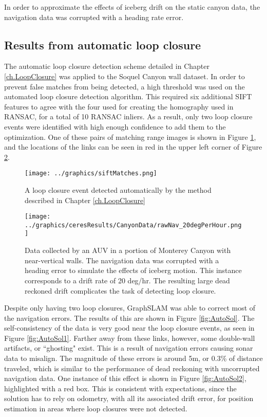 In order to approximate the effects of iceberg drift on the static canyon data, the navigation data was corrupted with a heading rate error. 

\subsection{Results from automatic loop closure}

The automatic loop closure detection scheme detailed in Chapter \ref{ch.LoopClosure} was applied to the Soquel Canyon wall dataset. In order to prevent false matches from being detected, a high threshold was used on the automated loop closure detection algorithm. This required six additional SIFT features to agree with the four used for creating the homography used in RANSAC, for a total of 10 RANSAC inliers. As a result, only two loop closure events were identified with high enough confidence to add them to the optimization.  One of these pairs of matching range images is shown in Figure \ref{fig:autoLC}, and the locations of the links can be seen in red in the upper left corner of Figure \ref{fig:RealDataWithDrift}.

 \begin{figure}[!htb]
   \centering
   \texttt{[image: ../graphics/siftMatches.png]} %
   \caption{A loop closure event detected automatically by the method described in Chapter \ref{ch.LoopClosure}}
   \label{fig:autoLC}
\end{figure}

 \begin{figure}[!htb]
   \centering
   \texttt{[image: ../graphics/ceresResults/CanyonData/rawNav\_20degPerHour.png]} %
   \caption{Data collected by an AUV in a portion of Monterey Canyon with near-vertical walls. The navigation data was corrupted with a heading error to simulate the effects of iceberg motion. This instance corresponds to a drift rate of 20 deg/hr. The resulting large dead reckoned drift complicates the task of detecting loop closure.}
   \label{fig:RealDataWithDrift}
\end{figure}

Despite only having two loop closures, GraphSLAM was able to correct most of the navigation errors. The results of this are shown in Figure \ref{fig:AutoSol}. The self-consistency of the data is very good near the loop closure events, as seen in Figure \ref{fig:AutoSol1}. Farther away from these links, however, some double-wall artifacts, or ``ghosting" exist. This is a result of navigation errors causing sonar data to misalign. The magnitude of these errors is around 5m, or 0.3\% of distance traveled, which is similar to the performance of dead reckoning with uncorrupted navigation data. One instance of this effect is shown in Figure \ref{fig:AutoSol2}, highlighted with a red box. This is consistent with expectations, since the solution has to rely on odometry, with all its associated drift error, for position estimation in areas where loop closures were not detected. 

